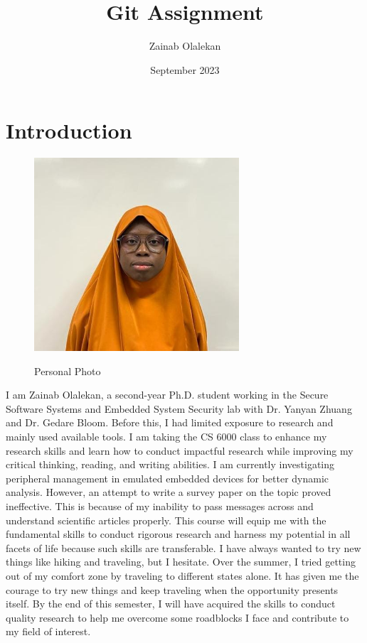\documentclass{article}
\title{Git Assignment}
\author{Zainab Olalekan}
\date{September 2023}
\begin{document}
\maketitle

\section{Introduction}  \label{sec-introduction}


\begin{figure}[h]
    \begin{center}
        \centering
    \includegraphics[width=3in]{Olalekan.jpg}
    \caption{Personal Photo}
    \centering
    \label{fig:figure1}
    \end{center}    
\end{figure}

I am Zainab Olalekan, a second-year Ph.D. student working in the Secure Software Systems and Embedded System Security lab with Dr. Yanyan Zhuang and Dr. Gedare Bloom. Before this, I had limited exposure to research and mainly used available tools. I am taking the CS 6000 class to enhance my research skills and learn how to conduct impactful research while improving my critical thinking, reading, and writing abilities. I am currently investigating peripheral management in emulated embedded devices for better dynamic analysis. However, an attempt to write a survey paper on the topic proved ineffective. This is because of my inability to pass messages across and understand scientific articles properly. This course will equip me with the fundamental skills to conduct rigorous research and harness my potential in all facets of life because such skills are transferable. I have always wanted to try new things like hiking and traveling, but I hesitate. Over the summer, I tried getting out of my comfort zone by traveling to different states alone. It has given me the courage to try new things and keep traveling when the opportunity presents itself. By the end of this semester, I will have acquired the skills to conduct quality research to help me overcome some roadblocks I face and contribute to my field of interest.
\end{document}
